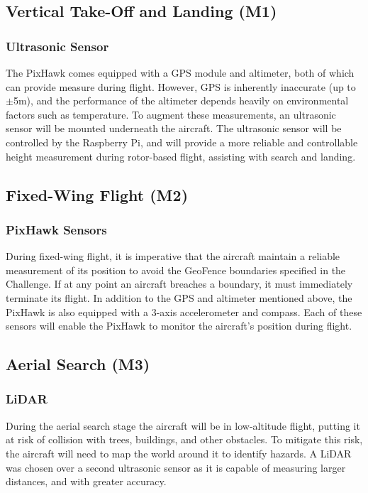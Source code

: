 \subsection{Vertical Take-Off and Landing (M1)}
\subsubsection*{Ultrasonic Sensor}
The PixHawk comes equipped with a GPS module and altimeter, both of which can provide measure during flight. However, GPS is inherently inaccurate (up to $\pm$5m), and the performance of the altimeter depends heavily on environmental factors such as temperature. To augment these measurements, an ultrasonic sensor will be mounted underneath the aircraft. The ultrasonic sensor will be controlled by the Raspberry Pi, and will provide a more reliable and controllable height measurement during rotor-based flight, assisting with search and landing.

\subsection{Fixed-Wing Flight (M2)}
\subsubsection*{PixHawk Sensors}
During fixed-wing flight, it is imperative that the aircraft maintain a reliable measurement of its position to avoid the GeoFence boundaries specified in the Challenge. If at any point an aircraft breaches a boundary, it must immediately terminate its flight. In addition to the GPS and altimeter mentioned above, the PixHawk is also equipped with a 3-axis accelerometer and compass. Each of these sensors will enable the PixHawk to monitor the aircraft's position during flight.

\subsection{Aerial Search (M3)}
\subsubsection*{LiDAR}
During the aerial search stage the aircraft will be in low-altitude flight, putting it at risk of collision with trees, buildings, and other obstacles. To mitigate this risk, the aircraft will need to map the world around it to identify hazards. A LiDAR was chosen over a second ultrasonic sensor as it is capable of measuring larger distances, and with greater accuracy.\\

